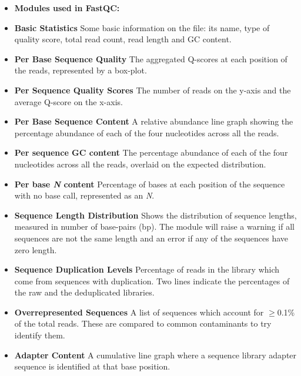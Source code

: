 \begin{itemize} \itemsep0em
\item[] \textbf{Modules used in FastQC:}
\item \textbf{Basic Statistics} \hspace{0.2cm} Some basic information on the file: its name, type of quality score, total read count, read length and GC content.
\item \textbf{Per Base Sequence Quality} \hspace{0.2cm} The aggregated Q-scores at each position of the reads, represented by a box-plot.
\item \textbf{Per Sequence Quality Scores} \hspace{0.2cm} The number of reads on the y-axis and the average Q-score on the x-axis.
\item \textbf{Per Base Sequence Content} \hspace{0.2cm} A relative abundance line graph showing the percentage abundance of each of the four nucleotides across all the reads. 
\item \textbf{Per sequence GC content} \hspace{0.2cm} The percentage abundance of each of the four nucleotides across all the reads, overlaid on the expected distribution. 
\item \textbf{Per base \textit{N} content} \hspace{0.2cm} Percentage of bases at each position of the sequence with no base call, represented as an \textit{N}.
\item \textbf{Sequence Length Distribution}\hspace{0.2cm} Shows the distribution of sequence lengths, measured in number of base-pairs (bp). The module will raise a warning if all sequences are not the same length and an error if any of the sequences have zero length.
\item \textbf{Sequence Duplication Levels} \hspace{0.2cm} Percentage of reads in the library which come from sequences with duplication. Two lines indicate the percentages of the raw and the deduplicated libraries.
\item \textbf{Overrepresented Sequences} \hspace{0.2cm} A list of sequences which account for $\geq$0.1\% of the total reads. These are compared to common contaminants to try identify them.
\item \textbf{Adapter Content} \hspace{0.2cm} A cumulative line graph where a sequence library adapter sequence is identified at that base position.
\end{itemize}

